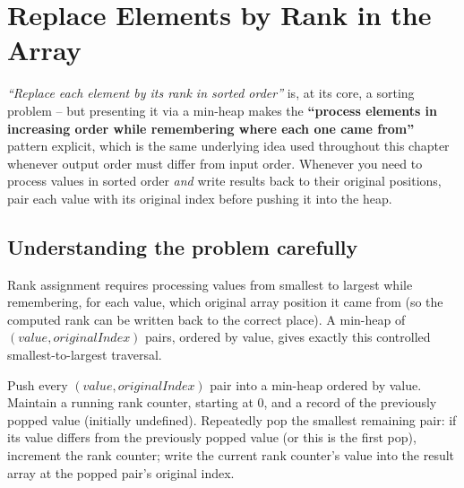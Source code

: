 \section{Replace Elements by Rank in the Array}
\label{sec:heap-replace-by-rank}


\begin{patternbox}
\emph{``Replace each element by its rank in sorted order''} is, at its
core, a sorting problem -- but presenting it via a min-heap makes the
\textbf{``process elements in increasing order while remembering where
each one came from''} pattern explicit, which is the same underlying idea
used throughout this chapter whenever output order must differ from input
order. Whenever you need to process values in sorted order \emph{and}
write results back to their original positions, pair each value with its
original index before pushing it into the heap.
\end{patternbox}

\subsection*{Understanding the problem carefully}

Rank assignment requires processing values from smallest to largest while
remembering, for each value, which original array position it came from
(so the computed rank can be written back to the correct place). A
min-heap of $(\textit{value}, \textit{originalIndex})$ pairs, ordered by
value, gives exactly this controlled smallest-to-largest traversal.

\begin{ideabox}
Push every $(\textit{value}, \textit{originalIndex})$ pair into a
min-heap ordered by value. Maintain a running rank counter, starting at
$0$, and a record of the previously popped value (initially undefined).
Repeatedly pop the smallest remaining pair: if its value differs from the
previously popped value (or this is the first pop), increment the rank
counter; write the current rank counter's value into the result array at
the popped pair's original index.
\end{ideabox}

